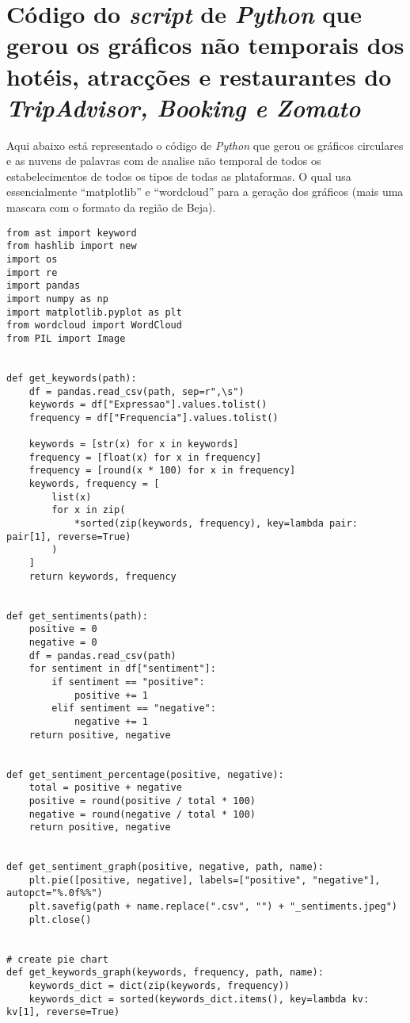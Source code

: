 \chapter{Código do \textit{script} de \textit{Python} que gerou os gráficos não temporais dos hotéis, atracções e restaurantes do \textit{TripAdvisor,  Booking e Zomato}}
\label{ap10}

Aqui abaixo está representado o código de \textit{Python} que gerou os gráficos circulares e as nuvens de palavras com
de analise não temporal de todos os estabelecimentos de todos os tipos de todas as plataformas. O qual usa essencialmente ``matplotlib'' e ``wordcloud'' para a geração dos gráficos (mais uma mascara com o formato da região de Beja).

\begin{verbatim}
from ast import keyword
from hashlib import new
import os
import re
import pandas
import numpy as np
import matplotlib.pyplot as plt
from wordcloud import WordCloud
from PIL import Image


def get_keywords(path):
    df = pandas.read_csv(path, sep=r",\s")
    keywords = df["Expressao"].values.tolist()
    frequency = df["Frequencia"].values.tolist()

    keywords = [str(x) for x in keywords]
    frequency = [float(x) for x in frequency]
    frequency = [round(x * 100) for x in frequency]
    keywords, frequency = [
        list(x)
        for x in zip(
            *sorted(zip(keywords, frequency), key=lambda pair: pair[1], reverse=True)
        )
    ]
    return keywords, frequency


def get_sentiments(path):
    positive = 0
    negative = 0
    df = pandas.read_csv(path)
    for sentiment in df["sentiment"]:
        if sentiment == "positive":
            positive += 1
        elif sentiment == "negative":
            negative += 1
    return positive, negative


def get_sentiment_percentage(positive, negative):
    total = positive + negative
    positive = round(positive / total * 100)
    negative = round(negative / total * 100)
    return positive, negative


def get_sentiment_graph(positive, negative, path, name):
    plt.pie([positive, negative], labels=["positive", "negative"], autopct="%.0f%%")
    plt.savefig(path + name.replace(".csv", "") + "_sentiments.jpeg")
    plt.close()


# create pie chart
def get_keywords_graph(keywords, frequency, path, name):
    keywords_dict = dict(zip(keywords, frequency))
    keywords_dict = sorted(keywords_dict.items(), key=lambda kv: kv[1], reverse=True)


\end{verbatim}
